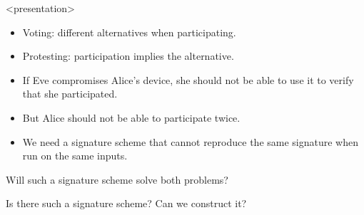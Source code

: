 \begin{frame}<presentation>
  \begin{remark}
    \begin{itemize}
      \item Voting: different alternatives when participating.
      \item Protesting: participation implies the alternative.
    \end{itemize}
  \end{remark}

  \pause

  \begin{idea}
    \begin{itemize}
      \item If Eve compromises Alice's device, she should not be able to use 
        it to verify that she participated.

      \item But Alice should not be able to participate twice.

      \item We need a signature scheme that cannot reproduce the same 
        signature when run on the same inputs.
    \end{itemize}
  \end{idea}
\end{frame}

\begin{frame}
  \begin{question}
    Will such a signature scheme solve both problems?
  \end{question}
  \begin{question}
    Is there such a signature scheme?
    Can we construct it?
  \end{question}
\end{frame}
